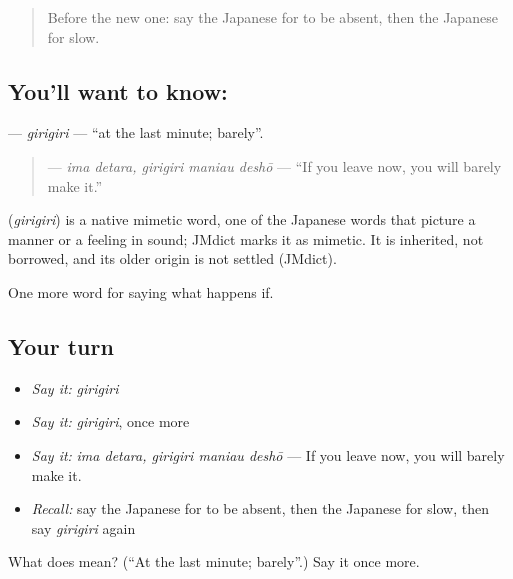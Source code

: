 \label{lesson:JA-C348-girigiri}



\begin{quote}
Before the new one: say the Japanese for to be absent, then the Japanese for slow.
\end{quote}

\subsection*{You'll want to know: }
\textbf{} — \emph{girigiri} — \textquotedblleft{}at the last minute; barely\textquotedblright{}.

\begin{quote}
\textbf{  } — \emph{ima detara, girigiri maniau deshō} — \textquotedblleft{}If you leave now, you will barely make it.\textquotedblright{}
\end{quote}

\begin{cousinweb}
\textbf{} (\emph{girigiri}) is a native mimetic word, one of the Japanese words that picture a manner or a feeling in sound; JMdict marks it as mimetic. It is inherited, not borrowed, and its older origin is not settled (JMdict).
\end{cousinweb}

\begin{grammarlens}[title={What you've built}]
One more word for saying what happens if.
\end{grammarlens}

\subsection*{Your turn}
\begin{itemize}
\raggedright
  \item \emph{Say it:} \emph{girigiri}
  \item \emph{Say it:} \emph{girigiri}, once more
  \item \emph{Say it:} \emph{ima detara, girigiri maniau deshō} — If you leave now, you will barely make it.
  \item \emph{Recall:} say the Japanese for to be absent, then the Japanese for slow, then say \emph{girigiri} again
\end{itemize}

\begin{tcolorbox}[breakable,colback=teal!4,colframe=teal!35!black,title={Before you move on}]
What does  mean? (\textquotedblleft{}At the last minute; barely\textquotedblright{}.) Say it once more.
\end{tcolorbox}
